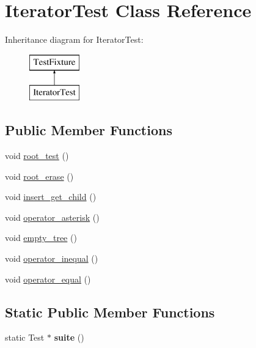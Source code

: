 \hypertarget{class_iterator_test}{}\section{Iterator\+Test Class Reference}
\label{class_iterator_test}
Inheritance diagram for Iterator\+Test\+:\begin{figure}[H]
\begin{center}
\leavevmode
\includegraphics[height=2.000000cm]{class_iterator_test}
\end{center}
\end{figure}
\subsection*{Public Member Functions}
\begin{DoxyCompactItemize}
\item 
void \hyperlink{class_iterator_test_a9a97bde928f26d4482c1f422dff08b1e}{root\+\_\+test} ()
\item 
void \hyperlink{class_iterator_test_a4defa697edd8ac31231e2f437f5b01e5}{root\+\_\+erase} ()
\item 
void \hyperlink{class_iterator_test_a12ba95e8b8465d2378afd5db43efc6e5}{insert\+\_\+get\+\_\+child} ()
\item 
void \hyperlink{class_iterator_test_a7b80412e084b4a4502daddba5102e3c5}{operator\+\_\+asterisk} ()
\item 
void \hyperlink{class_iterator_test_a826f30ef86193414b8ceb03e76592b37}{empty\+\_\+tree} ()
\item 
void \hyperlink{class_iterator_test_acd1cdaec5c6d5a2b183bbb8dbd979c2a}{operator\+\_\+inequal} ()
\item 
void \hyperlink{class_iterator_test_a4bd66d05af2e1fc6c3d7850ccc7ac783}{operator\+\_\+equal} ()
\end{DoxyCompactItemize}
\subsection*{Static Public Member Functions}
\begin{DoxyCompactItemize}
\item 
\mbox{\label{class_iterator_test_a5251aa78e108a94e3b969a784a74d5e6}} 
static Test $\ast$ {\bfseries suite} ()
\end{DoxyCompactItemize}


